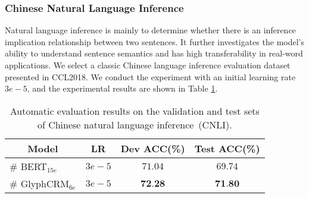 \subsubsection{Chinese Natural Language Inference} Natural language inference is mainly to determine whether there is an inference implication relationship between two sentences. It further investigates the model's ability to understand sentence semantics and has high transferability in real-word applications. We select a classic Chinese language inference evaluation dataset presented in CCL2018. We conduct the experiment with an initial learning rate $3e-5$, and the experimental results are shown in Table \ref{tab:exp3}.
\begin{table}[H]
\renewcommand\arraystretch{1.1}
    \centering
     \caption{Automatic evaluation results on the validation and test sets of Chinese natural language inference~(CNLI).}
    \label{tab:exp3}
    \begin{tabular}{lccc}
    \toprule[0.9pt]
    \multicolumn{1}{c}{\textbf{Model}} & \multicolumn{1}{c}{\textbf{LR}} & \multicolumn{1}{c}{\textbf{Dev ACC(\%)}} & \multicolumn{1}{c}{\textbf{Test ACC(\%)}} \\\midrule[0.7pt]
    \# BERT$_{15e}$ & $3e-5$ & $71.04$ & $69.74$ \\
    \# GlyphCRM$_{6e}$ & $3e-5$ & $\textbf{72.28}$ & $\textbf{71.80}$\\
    \bottomrule[0.9pt]
    \end{tabular}
\end{table}
